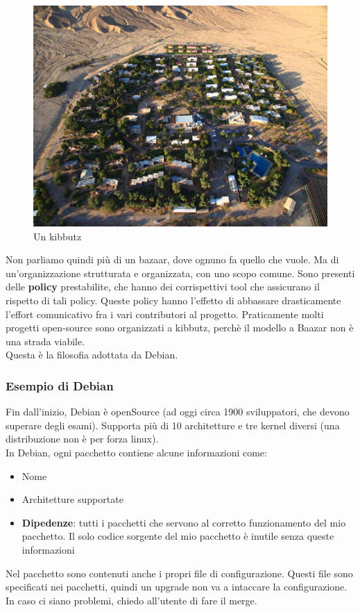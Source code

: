 \documentclass[a4paper,12pt]{article}
\begin{document}
\begin{figure}[H]
	\centering
	 \includegraphics[width=0.6\linewidth]{Immagini/kibbutz.jpg}
	 \caption{Un kibbutz}
\end{figure}

Non parliamo quindi più di un bazaar, dove ognuno fa quello che vuole. Ma di un'organizzazione strutturata e organizzata, con uno scopo comune. Sono presenti delle \textbf{policy} prestabilite, che hanno dei corrispettivi tool che assicurano il rispetto di tali policy. Queste policy hanno l'effetto di abbassare drasticamente l'effort comunicativo fra i vari contributori al progetto. Praticamente molti progetti open-source sono organizzati a kibbutz, perchè il modello a Baazar non è una strada viabile. 
\\Questa è la filosofia adottata da Debian.

\subsubsection{Esempio di Debian}
Fin dall'inizio, Debian è openSource (ad oggi circa 1900 sviluppatori, che devono superare degli esami). Supporta più di 10 architetture e tre kernel diversi (una distribuzione non è per forza linux).\\
In Debian, ogni pacchetto contiene alcune informazioni come:
\begin{itemize}
 \item Nome
 \item Architetture supportate
 \item \textbf{Dipedenze}: tutti i pacchetti che servono al corretto funzionamento del mio pacchetto. Il solo codice sorgente del mio pacchetto è inutile senza queste informazioni
\end{itemize}

Nel pacchetto sono contenuti anche i propri file di configurazione. Questi file sono specificati nei pacchetti, quindi un upgrade non va a intaccare la configurazione. In caso ci siano problemi, chiedo all'utente di fare il merge.
\end{document}
